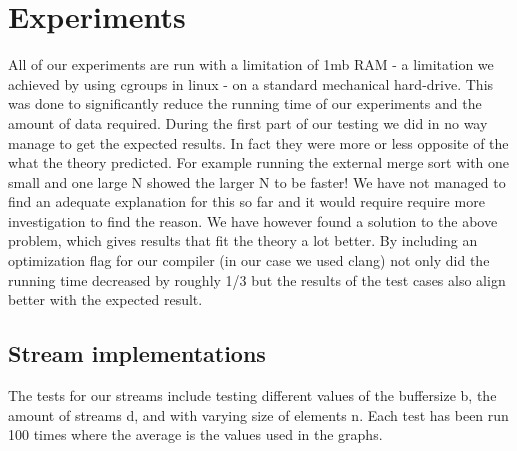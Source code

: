 \section{Experiments}

All of our experiments are run with a limitation of 1mb RAM - a limitation we achieved by using cgroups in linux - on a standard mechanical hard-drive. This was done to significantly reduce the running time of our experiments and the amount of data required. 
During the first part of our testing we did in no way manage to get the expected results. In fact they were more or less opposite of the what the theory predicted. For example running the external merge sort with one small and one large N showed the larger N to be faster! We have not managed to find an adequate explanation for this so far and it would require require more investigation to find the reason.
We have however found a solution to the above problem, which gives results that fit the theory a lot better. By including an optimization flag for our compiler (in our case we used clang) not only did the running time decreased by roughly 1/3 but the results of the test cases also align better with the expected result. 

\subsection{Stream implementations}
The tests for our streams include testing different values of the buffersize b, the amount of streams d, and with varying size of elements n. 
Each test has been run 100 times where the average is the values used in the graphs. 

